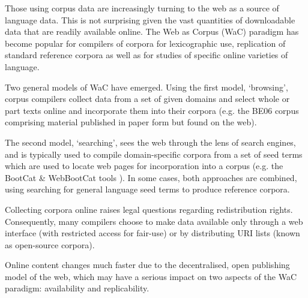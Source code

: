 
Those using corpus data are increasingly turning
to the web as a source of language data. 
This is not surprising given the vast quantities of downloadable data
that are readily available online. 
The Web as Corpus (WaC) paradigm\cite{kilgarriff2003introduction} 
has become popular for compilers of corpora for lexicographic use, 
replication of standard reference corpora as well as for studies of specific online varieties of language. 

Two general models of WaC have emerged. Using the first model, `browsing', corpus compilers collect data from a set of given domains and select whole or part texts online and incorporate them into their corpora (e.g. the BE06\cite{baker2009be06} corpus comprising material published in paper form but found on the web).

The second model, `searching', sees the web through the lens of search engines, and is typically used to compile domain-specific corpora from a set of seed terms which are used to locate web pages for incorporation into a corpus (e.g. the BootCat \& WebBootCat tools \cite{baroni2004bootcat}). %
In some cases, both approaches are combined, using searching for general language seed terms to produce reference corpora\cite{kilgarriff2010corpus}.

Collecting corpora online raises legal questions regarding redistribution rights.  Consequently, many compilers choose to make data available only through a web interface (with restricted access for fair-use) or by distributing URI lists (known as open-source corpora\cite{sharoff2006open}).



Online content changes much faster due to the decentralised, open publishing model of the web, which may have a serious impact on two aspects of the WaC paradigm: availability and replicability.

